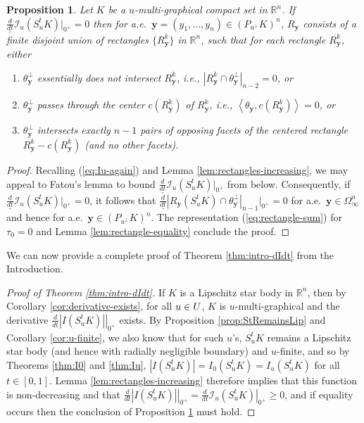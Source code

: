 \documentclass[11pt]{article}
\newtheorem{proposition}[thm]{Proposition}
\theoremstyle{definition}
\theoremstyle{proof}
\newcommand{\dt}[1]{\left . \frac{d}{dt} #1 \right |_{0^+}}
\newcommand{\dtll}[1]{\underline{\frac{d}{dt}} #1 |_{0^+}}
\DeclareMathOperator{\+}{\mathop{\tilde{+}}}
\newcommand{\scalar}[1]{\left \langle #1 \right \rangle}
\newcommand{\R}{\mathbb{R}}
\newcommand{\I}{\mathcal{I}}
\newcommand{\y}{\mathbf{y}}
\numberwithin{equation}{section}
\numberwithin{equation}{section}
\begin{document}
\begin{proposition} \label{prop:rectangle-equality}
Let $K$ be a $u$-multi-graphical compact set in $\R^n$. If $\dtll{\I_u(S_u^t K)} =  0$
then for a.e.~$\y = (y_1,\ldots,y_n) \in (P_{u^{\perp}} K)^n$, $R_\y$ consists of a finite disjoint union of rectangles $\{R_\y^k\}$ in $\R^n$, 
such that for each rectangle $R_\y^k$, either
\begin{enumerate} 
\item \label{it:equality-cond1} $\theta_\y^{\perp}$ essentially does not intersect $R_\y^k$, i.e., $|R_\y^k \cap \theta_\y^{\perp}|_{n-2} = 0$, or 
\item \label{it:equality-cond2} $\theta_\y^{\perp}$ passes through the center $c(R_\y^k)$ of $R_\y^k$, i.e., $\scalar{\theta_\y , c(R_\y^k)} = 0$, or 
\item \label{it:equality-cond3} $\theta_\y^{\perp}$ intersects exactly $n-1$ pairs of opposing facets of the centered rectangle $R_\y^k -  c(R_\y^k)$ (and no other facets). 
\end{enumerate}
\end{proposition}
\begin{proof}
Recalling (\ref{eq:Iu-again}) and Lemma \ref{lem:rectangles-increasing}, we may appeal to Fatou's lemma to bound $\dtll{\I_u(S_u^t K)}$ from below. Consequently, if $\dtll{\I_u(S_u^t K)} = 0$, it follows that $ \dtll{|R_\y(S_u^t K) \cap \theta_\y^{\perp}|_{n-1}} = 0$ for a.e.~$\y \in \Omega_\infty^n$ and hence for a.e.~$\y \in (P_{u^{\perp}} K)^n$. The representation (\ref{eq:rectangle-sum}) for $\tau_0=0$ and Lemma \ref{lem:rectangle-equality} conclude the proof. 
\end{proof}

We can now provide a complete proof of Theorem \ref{thm:intro-dIdt} from the Introduction.
\begin{proof}[Proof of Theorem \ref{thm:intro-dIdt}]
If $K$ is a Lipschitz star body in $\R^n$, then by Corollary \ref{cor:derivative-exists}, for all $u \in U$, $K$ is $u$-multi-graphical and the derivative $\dt{|I(S_u^t K)|}$ exists. By Proposition \ref{prop:StRemainsLip} and Corollary \ref{cor:u-finite}, we also know that for such $u$'s, $S_u^t K$ remains a Lipschitz star body (and hence with radially negligible boundary) and $u$-finite, and so by Theorems \ref{thm:I0} and \ref{thm:Iu}, $|I(S_u^t K)| = I_0(S_u^t K) = I_u(S_u^t K)$ for all $t \in [0,1]$. Lemma \ref{lem:rectangles-increasing} therefore implies that this function is non-decreasing and that $\dt{|I(S_u^t K)|} = \dt{\I_u(S_u^t K)}\geq 0$, and if equality occurs then the conclusion of Proposition \ref{prop:rectangle-equality} must hold.  
\end{proof}
\end{document}
